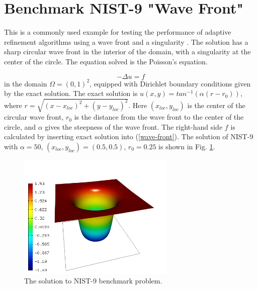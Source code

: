 \documentclass[12pt]{elsarticle}
\begin{document}

\section{Benchmark NIST-9 "Wave Front"}
\label{sec:bench-9}

This is a commonly used example for testing the performance of
adaptive refinement algorithms using a wave front and a singularity \cite{mitchell-1, mitchell-2}.
The solution has a sharp circular wave front in the interior of the
domain, with a singularity at the center of the circle.
The equation solved is the Poisson's equation.

\begin{equation} \label{wave-front}
-\Delta u = f
\end{equation}
in the domain $\Omega = (0, 1)^2$, equipped with Dirichlet boundary conditions
given by the exact solution. The exact solution is
$u(x, y) = tan^{-1}(\alpha (r - r_{0}))$,
where $r = \sqrt{(x - x_{loc})^{2} + (y - y_{loc})^{2}}$.
Here $(x_{loc}, y_{loc})$ is the center of the circular wave front,
$r_{0}$ is the distance from the wave front to the center of the circle,
and $\alpha$ gives the steepness of the wave front.
The right-hand side $f$ is calculated by inserting exact solution into (\ref{wave-front}).
The solution of NIST-9 with $\alpha = 50$, $(x_{loc}, y_{loc}) = (0.5, 0.5)$,
$r_{0} = 0.25$ is shown in Fig. \ref{fig:sln-nist09}.

\begin{figure}[!ht]
\centering
\includegraphics[height=6cm]{nist/nist-9/solution.png}
\caption{The solution to NIST-9 benchmark problem.}
\label{fig:sln-nist09}
\end{figure}
\end{document}
